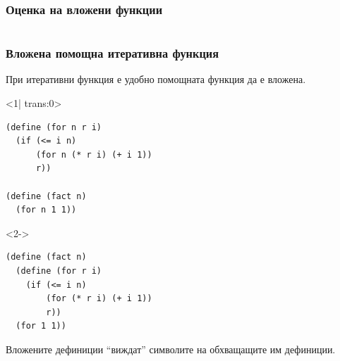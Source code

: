 \documentclass[alsotrans]{beamerswitch}
\begin{document}
\begin{frame}
  \frametitle{Оценка на вложени функции}

  \scriptsize\lstscriptsize
  \begin{overlayarea}{\textwidth}{.85\textheight}
    \begin{columns}[T,onlytextwidth]
      \begin{column}{.5\textwidth}
      \end{column}
      \begin{column}{.5\textwidth}
      \end{column}
    \end{columns}
  \end{overlayarea}
\end{frame}

\begin{frame}[fragile]
  \frametitle{Вложена помощна итеративна функция}

  При итеративни функция е удобно помощната функция да е вложена.
  \begin{overlayarea}{\textwidth}{.5\textheight}
    \begin{onlyenv}<1| trans:0>
\begin{lstlisting}
(define (for n r i)
  (if (<= i n)
      (for n (* r i) (+ i 1))
      r))

(define (fact n)
  (for n 1 1))
\end{lstlisting}
    \end{onlyenv}
    \begin{onlyenv}<2->
\begin{lstlisting}
(define (fact n)
  (define (for r i)
    (if (<= i n)
        (for (* r i) (+ i 1))
        r))
  (for 1 1))
\end{lstlisting}
    \end{onlyenv}
  \end{overlayarea}
  Вложените дефиниции ``виждат'' символите на обхващащите им дефиниции.
\end{frame}
\end{document}
